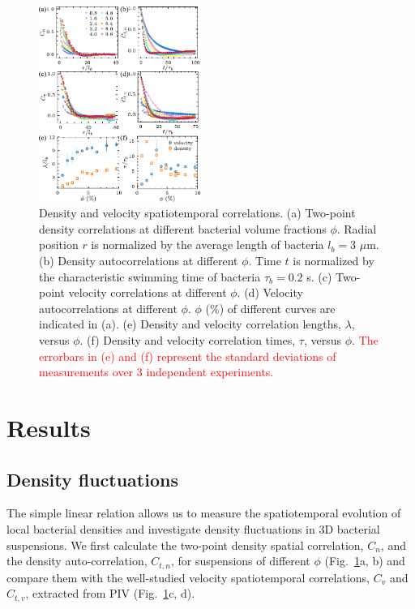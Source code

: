 \documentclass[twocolumn,aps,prx,amsmath,amssymb,longbibliography,superscriptaddress]{revtex4-2}
\begin{document}
\begin{figure}[t]
	\begin{center}
		\includegraphics[width=0.47\textwidth]{Figures/fig-2.pdf}
		\caption[spatiotemporal-correlations.]
		{
			Density and velocity spatiotemporal correlations. (a) Two-point density correlations at different bacterial volume fractions $\phi$. Radial position $r$ is normalized by the average length of bacteria $l_b = 3$ $\mu$m. (b) Density autocorrelations at different $\phi$. Time $t$ is normalized by the characteristic swimming time of bacteria $\tau_b = 0.2$ s. (c) Two-point velocity correlations at different $\phi$. (d) Velocity autocorrelations at different $\phi$. $\phi$ ($\%$) of different curves are indicated in (a). (e) Density and velocity correlation lengths, $\lambda$, versus $\phi$. (f) Density and velocity correlation times, $\tau$, versus $\phi$. \textcolor{red}{The errorbars in (e) and (f) represent the standard deviations of measurements over 3 independent experiments.}
		}
		\label{fig:spatiotemporal-correlations}
	\end{center}
\end{figure}




\section{Results}

\subsection{Density fluctuations}

The simple linear relation allows us to measure the spatiotemporal evolution of local bacterial densities and investigate density fluctuations in 3D bacterial suspensions. We first calculate the two-point density spatial correlation, $C_n$, and the density auto-correlation, $C_{t,n}$, for suspensions of different $\phi$ (Fig.~\ref{fig:spatiotemporal-correlations}a, b) and compare them with the well-studied velocity spatiotemporal correlations, $C_{v}$ and $C_{t,v}$, extracted from PIV (Fig.~\ref{fig:spatiotemporal-correlations}c, d).
\end{document}
